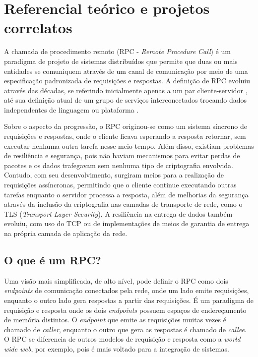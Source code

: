 \chapter{Referencial teórico e projetos correlatos}
\label{chp:capitulo2}

A chamada de procedimento remoto (RPC - \textit{Remote Procedure Call}) é um paradigma de projeto de sistemas distribuídos que permite que duas ou mais entidades se comuniquem através de um canal de comunicação por meio de uma especificação padronizada de requisições e respostas. A definição de RPC evoluiu através das décadas, se referindo inicialmente apenas a um par cliente-servidor \cite{nelson_remote_1981}, até sua definição atual de um grupo de serviços interconectados trocando dados independentes de linguagem ou plataforma \cite{slee_thrift_nodate}. 

Sobre o aspecto da progressão, o RPC originou-se como um sistema síncrono de requisições e respostas, onde o cliente ficava esperando a resposta retornar, sem executar nenhuma outra tarefa nesse meio tempo. Além disso, existiam problemas de resiliência e segurança, pois não haviam mecanismos para evitar perdas de pacotes e os dados trafegavam sem nenhuma tipo de criptografia envolvida. Contudo, com seu desenvolvimento, surgiram meios para a realização de requisições assíncronas, permitindo que o cliente continue executando outras tarefas enquanto o servidor processa a resposta, além de melhorias da segurança através da inclusão da criptografia nas camadas de transporte de rede, como o TLS (\textit{Transport Layer Security}). A resiliência na entrega de dados também evoluiu, com uso do TCP ou de implementações de meios de garantia de entrega na própria camada de aplicação da rede.

\section{O que é um RPC?}
\label{sec:o_que_e_um_rpc}

Uma visão mais simplificada, de alto nível, pode definir o RPC como dois \textit{endpoints} de comunicação conectados pela rede, onde um lado emite requisições, enquanto o outro lado gera respostas a partir das requisições. É um paradigma de requisição e resposta onde os dois \textit{endpoints} possuem espaços de endereçamento de memória distintos. O \textit{endpoint} que emite as requisições muitas vezes é chamado de \textit{caller}, enquanto o outro que gera as respostas é chamado de \textit{callee}. O RPC se diferencia de outros modelos de requisição e resposta como a \textit{world wide web}, por exemplo, pois é mais voltado para a integração de sistemas.

